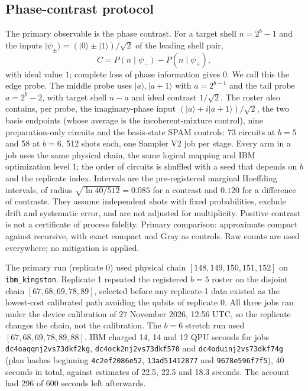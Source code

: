 \documentclass[11pt]{article}
\newcommand{\ket}[1]{\lvert #1\rangle}
\begin{document}
\subsection{Phase-contrast protocol}
The primary observable is the phase contrast. For a target shell $n=2^b-1$ and the inputs $\ket{\psi_\pm}=(\ket0\pm\ket1)/\sqrt2$ of the leading shell pair,
\begin{equation}
 C=P(n\mid\psi_-)-P(n\mid\psi_+),
\end{equation}
with ideal value $1$; complete loss of phase information gives $0$. We call this the edge probe. The middle probe uses $\ket{a},\ket{a+1}$ with $a=2^{b-1}$ and the tail probe $a=2^b-2$, with target shell $n-a$ and ideal contrast $1/\sqrt2$. The roster also contains, per probe, the imaginary-phase input $(\ket a+i\ket{a+1})/\sqrt2$, the two basis endpoints (whose average is the incoherent-mixture control), nine preparation-only circuits and the basis-state SPAM controls: 73 circuits at $b=5$ and 58 at $b=6$, 512 shots each, one Sampler V2 job per stage. Every arm in a job uses the same physical chain, the same logical mapping and IBM optimization level 1; the order of circuits is shuffled with a seed that depends on $b$ and the replicate index. Intervals are the pre-registered marginal Hoeffding intervals, of radius $\sqrt{\ln40/512}=0.085$ for a contrast and $0.120$ for a difference of contrasts. They assume independent shots with fixed probabilities, exclude drift and systematic error, and are not adjusted for multiplicity. Positive contrast is not a certificate of process fidelity. Primary comparison: approximate compact against recursive, with exact compact and Gray as controls. Raw counts are used everywhere; no mitigation is applied.

The primary run (replicate 0) used physical chain $[148,149,150,151,152]$ on \texttt{ibm\_kingston}. Replicate 1 repeated the registered $b=5$ roster on the disjoint chain $[67,68,69,78,89]$, selected before any replicate-1 data existed as the lowest-cost calibrated path avoiding the qubits of replicate 0. All three jobs ran under the device calibration of 27 November 2026, 12:56 UTC, so the replicate changes the chain, not the calibration. The $b=6$ stretch run used $[67,68,69,78,89,88]$. IBM charged 14, 14 and 12 QPU seconds for jobs \texttt{dc4oaqqnj2vs73dkf2kg}, \texttt{dc4ock2nj2vs73dkf570} and \texttt{dc4oduinj2vs73dkf74g} (plan hashes beginning \texttt{4c2ef2086e52}, \texttt{13ad51412877} and \texttt{9678e596f7f5}), 40 seconds in total, against estimates of 22.5, 22.5 and 18.3 seconds. The account had 296 of 600 seconds left afterwards.
\end{document}
